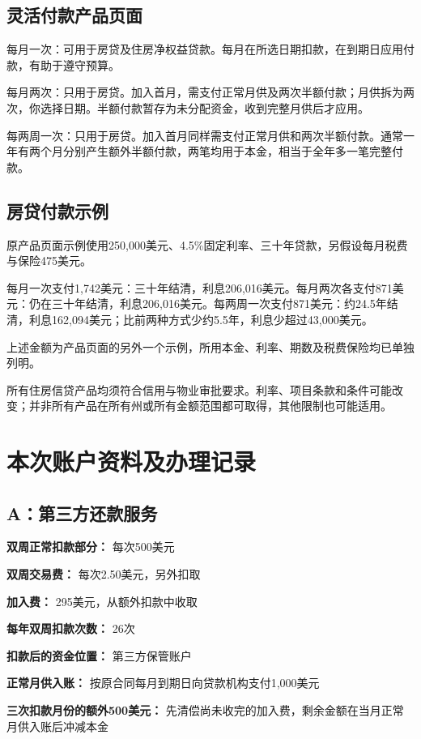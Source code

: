 \documentclass[UTF8,fontset=none,11pt,a4paper]{ctexart}
\begin{document}
\subsection*{灵活付款产品页面}
每月一次：可用于房贷及住房净权益贷款。每月在所选日期扣款，在到期日应用付款，有助于遵守预算。


每月两次：只用于房贷。加入首月，需支付正常月供及两次半额付款；月供拆为两次，你选择日期。半额付款暂存为未分配资金，收到完整月供后才应用。


每两周一次：只用于房贷。加入首月同样需支付正常月供和两次半额付款。通常一年有两个月分别产生额外半额付款，两笔均用于本金，相当于全年多一笔完整付款。


\subsection*{房贷付款示例}
原产品页面示例使用250,000美元、4.5\%固定利率、三十年贷款，另假设每月税费与保险475美元。


每月一次支付1,742美元：三十年结清，利息206,016美元。每月两次各支付871美元：仍在三十年结清，利息206,016美元。每两周一次支付871美元：约24.5年结清，利息162,094美元；比前两种方式少约5.5年，利息少超过43,000美元。


上述金额为产品页面的另外一个示例，所用本金、利率、期数及税费保险均已单独列明。


所有住房信贷产品均须符合信用与物业审批要求。利率、项目条款和条件可能改变；并非所有产品在所有州或所有金额范围都可取得，其他限制也可能适用。


\section*{本次账户资料及办理记录}
\subsection*{A：第三方还款服务}
\textbf{双周正常扣款部分：} 每次500美元


\textbf{双周交易费：} 每次2.50美元，另外扣取


\textbf{加入费：} 295美元，从额外扣款中收取


\textbf{每年双周扣款次数：} 26次


\textbf{扣款后的资金位置：} 第三方保管账户


\textbf{正常月供入账：} 按原合同每月到期日向贷款机构支付1,000美元


\textbf{三次扣款月份的额外500美元：} 先清偿尚未收完的加入费，剩余金额在当月正常月供入账后冲减本金
\end{document}
